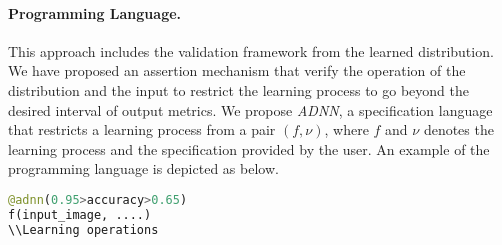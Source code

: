 \paragraph{\textbf{Programming Language.}} This approach includes the validation framework from the learned distribution. We have proposed an assertion mechanism that verify the operation of the distribution and the input to restrict the learning process to go beyond the desired interval of output metrics. We propose \emph{ADNN}, a specification language that restricts a learning process from a pair $(f,\nu)$, where $f$ and $\nu$ denotes the learning process and the specification provided by the user. An example of the programming language is depicted as below.
\begin{lstlisting}[language=Python, caption=Accountable specification language]
@adnn(0.95>accuracy>0.65)
f(input_image, ....)
\\Learning operations
\end{lstlisting}